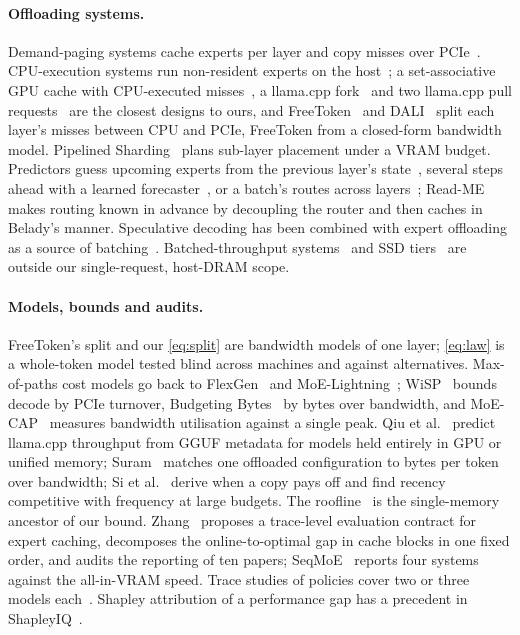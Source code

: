 \documentclass[10pt,twocolumn]{article}
\begin{document}
\paragraph{Offloading systems.} Demand-paging systems cache experts per layer and copy misses over
PCIe~\cite{eliseev2023offloading,xue2024moeinfinity,song2024promoe,tang2024hobbit,pagingexperts2026}. CPU-execution systems run
non-resident experts on the host~\cite{kamahori2024fiddler,ktransformers,zhong2025hybrimoe,daop2025,wang2026cloudgrade};
a set-associative GPU cache with CPU-executed misses~\cite{huang2025cpugpu}, a llama.cpp fork~\cite{leloch2026,llamacppdisc24528}
and two llama.cpp pull requests~\cite{llamacpppr26563,llamacpppr27861} are the closest designs to ours, and
FreeToken~\cite{freetoken} and DALI~\cite{dali2026} split each layer's misses between CPU and PCIe, FreeToken from a
closed-form bandwidth model. Pipelined Sharding~\cite{pipelinedsharding2026} plans sub-layer placement under a VRAM
budget. Predictors guess upcoming experts from the previous layer's state~\cite{hwang2024pregated,zhu2025preattention},
several steps ahead with a learned forecaster~\cite{wang2026seqmoe,mira2026}, or a batch's routes across
layers~\cite{expertflow}; Read-ME~\cite{readme2024} makes routing known in advance by decoupling the router and then
caches in Belady's manner. Speculative decoding has been combined with expert offloading as a source of
batching~\cite{spmoe,moespac2026,cascade2025}. Batched-throughput systems~\cite{flexgen2023,cao2024moelightning,yuan2025moelens}
and SSD tiers~\cite{ssdllama,edgezero} are outside our single-request, host-DRAM scope.

\paragraph{Models, bounds and audits.} FreeToken's split and our \cref{eq:split} are bandwidth models of one layer;
\cref{eq:law} is a whole-token model tested blind across machines and against alternatives. Max-of-paths cost models
go back to FlexGen~\cite{flexgen2023} and MoE-Lightning~\cite{cao2024moelightning}; WiSP~\cite{wisp2026} bounds decode by
PCIe turnover, Budgeting Bytes~\cite{budgetingbytes2026} by bytes over bandwidth, and MoE-CAP~\cite{moecap} measures
bandwidth utilisation against a single peak. Qiu et al.~\cite{qiu2026gguf} predict llama.cpp throughput from GGUF
metadata for models held entirely in GPU or unified memory; Suram~\cite{cacheable} matches one offloaded configuration
to bytes per token over bandwidth; Si et al.~\cite{si2026expertcache} derive when a copy pays off and find recency
competitive with frequency at large budgets. The roofline~\cite{williams2009roofline} is the single-memory ancestor of
our bound. Zhang~\cite{zhang2026reproducible} proposes a trace-level evaluation contract for expert caching, decomposes
the online-to-optimal gap in cache blocks in one fixed order, and audits the reporting of ten papers; SeqMoE~\cite{wang2026seqmoe}
reports four systems against the all-in-VRAM speed. Trace studies of policies cover two or three models
each~\cite{zhang2026reproducible,si2026expertcache,flashmoe2026,specmd}. Shapley attribution of a performance gap has a
precedent in ShapleyIQ~\cite{shapleyiq2024}.
\end{document}
